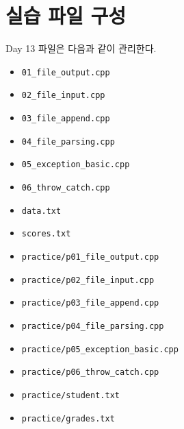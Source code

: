 \documentclass[11pt,a4paper]{article}
\begin{document}
\section{실습 파일 구성}
\begin{practicebox}
Day 13 파일은 다음과 같이 관리한다.
\begin{itemize}[leftmargin=1.5em]
    \item \texttt{01\_file\_output.cpp}
    \item \texttt{02\_file\_input.cpp}
    \item \texttt{03\_file\_append.cpp}
    \item \texttt{04\_file\_parsing.cpp}
    \item \texttt{05\_exception\_basic.cpp}
    \item \texttt{06\_throw\_catch.cpp}
    \item \texttt{data.txt}
    \item \texttt{scores.txt}
    \item \texttt{practice/p01\_file\_output.cpp}
    \item \texttt{practice/p02\_file\_input.cpp}
    \item \texttt{practice/p03\_file\_append.cpp}
    \item \texttt{practice/p04\_file\_parsing.cpp}
    \item \texttt{practice/p05\_exception\_basic.cpp}
    \item \texttt{practice/p06\_throw\_catch.cpp}
    \item \texttt{practice/student.txt}
    \item \texttt{practice/grades.txt}
\end{itemize}
\end{practicebox}
\end{document}
